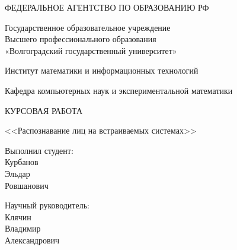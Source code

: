 \documentclass[12pt,a4paper]{scrartcl}
\begin{document}
\begin{titlepage}
	\begin{center}
	    \large
	    	ФЕДЕРАЛЬНОЕ АГЕНТСТВО ПО ОБРАЗОВАНИЮ РФ
	    \vspace{0.5cm}
	    
	    Государственное образовательное учреждение \\
	    Высшего профессионального образования \\
	    «Волгоградский государственный университет»
	    
	    \vspace{0.5cm}
	    
	    Институт математики и информационных технологий
	    
	    Кафедра компьютерных наук и экспериментальной математики
	    \vspace{2.5cm}
	
	    \textsc{КУРСОВАЯ РАБОТА}\\
	    
	    \begin{spacing}{1.3}
	    	<<Распознавание лиц на встраиваемых системах>>
	    \end{spacing}
	\end{center}

	\vfill
	
	\newlength{\ML}
	
	\hfill\begin{minipage}{0.4\textwidth}
	  Выполнил студент:\\
	  Курбанов\\
	  Эльдар \\
	  Ровшанович\\
	  \underline{\hspace{\ML}} 
	\end{minipage}
	
	\bigskip
	
	\hfill\begin{minipage}{0.4\textwidth}
	  Научный руководитель:\\
	  Клячин\\ 
	  Владимир\\ 
	  Александрович\\
	  \underline{\hspace{\ML}}
	\end{minipage}
	
	\bigskip
	

\end{titlepage}
\end{document}
